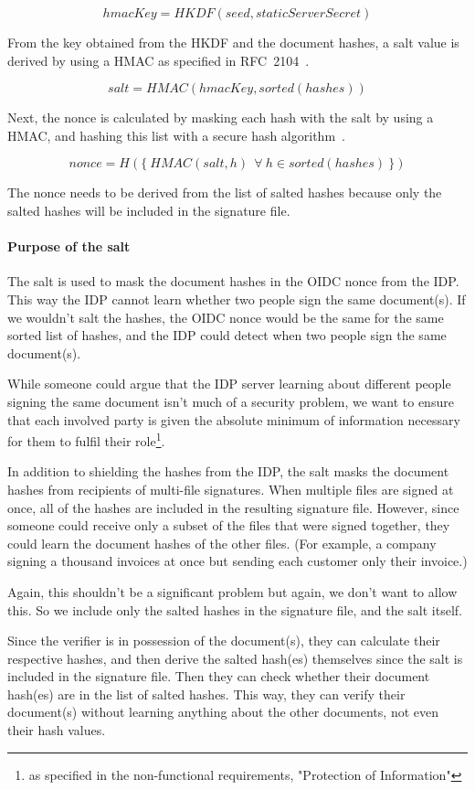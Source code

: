 \[ hmacKey = HKDF(seed, staticServerSecret) \]

From the key obtained from the \gls{HKDF} and the document hashes,
a salt value is derived by using a \gls{HMAC} as specified in RFC~2104~\cite{rfc2104}.

\[ salt = HMAC(hmacKey, sorted(hashes)) \]

Next, the nonce is calculated by masking each hash with the salt by using a \gls{HMAC},
and hashing this list with a secure hash algorithm~\cite{nistsha}.


\[ nonce = H(\{\ HMAC(salt, h) \ \ \forall \ h \in sorted(hashes)\ \}) \]

The nonce needs to be derived from the list of salted hashes because
only the salted hashes will be included in the signature file.


\paragraph{Purpose of the salt}
The salt is used to mask the document hashes in the \gls{OIDC} nonce from the \gls{IDP}.
This way the \gls{IDP} cannot learn whether two people sign the same document(s).
If we wouldn't salt the hashes, the \gls{OIDC} nonce would be the same for the same sorted list of hashes,
and the \gls{IDP} could detect when two people sign the same document(s).

While someone could argue that the IDP server learning about different people signing the same document
isn't much of a security problem, we want to ensure that each involved party is given the absolute minimum
of information necessary for them to fulfil their role\footnote{as specified in the non-functional requirements, "Protection of Information"}.

In addition to shielding the hashes from the \gls{IDP},
the salt masks the document hashes from recipients of multi-file signatures.
When multiple files are signed at once, all of the hashes are included in the resulting signature file.
However, since someone could receive only a subset of the files that were signed together,
they could learn the document hashes of the other files.
(For example, a company signing a thousand invoices at once but sending each customer only their invoice.)

Again, this shouldn't be a significant problem but again, we don't want to allow this.
So we include only the salted hashes in the signature file, and the salt itself.

Since the verifier is in possession of the document(s), they can calculate their respective hashes,
and then derive the salted hash(es) themselves since the salt is included in the signature file.
Then they can check whether their document hash(es) are in the list of salted hashes.
This way, they can verify their document(s) without learning anything about the other documents,
not even their hash values.

